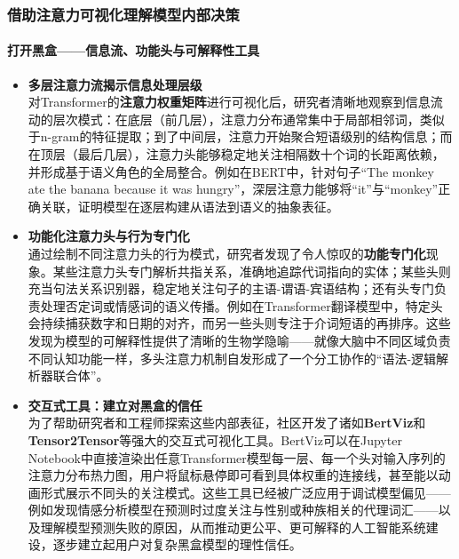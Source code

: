 \documentclass[11pt]{beamer}
\begin{document}
\begin{frame}
\frametitle{借助注意力可视化理解模型内部决策}
\framesubtitle{打开黑盒——信息流、功能头与可解释性工具}

\begin{itemize}
    \item \textbf{多层注意力流揭示信息处理层级} \\
    对Transformer的\textbf{注意力权重矩阵}进行可视化后，研究者清晰地观察到信息流动的层次模式：在底层（前几层），注意力分布通常集中于\alert{局部相邻词}，类似于n-gram的特征提取；到了中间层，注意力开始聚合短语级别的结构信息；而在顶层（最后几层），注意力头能够稳定地关注相隔数十个词的长距离依赖，并形成基于语义角色的全局整合。例如在BERT中，针对句子“The monkey ate the banana because it was hungry”，深层注意力能够将“it”与“monkey”正确关联，证明模型在逐层构建从语法到语义的抽象表征。

    \item \textbf{功能化注意力头与行为专门化} \\
    通过绘制不同注意力头的行为模式，研究者发现了令人惊叹的\textbf{功能专门化}现象。某些注意力头专门解析\alert{共指关系}，准确地追踪代词指向的实体；某些头则充当句法关系识别器，稳定地关注句子的主语-谓语-宾语结构；还有头专门负责处理否定词或情感词的语义传播。例如在Transformer翻译模型中，特定头会持续捕获数字和日期的对齐，而另一些头则专注于介词短语的再排序。这些发现为模型的可解释性提供了清晰的生物学隐喻——就像大脑中不同区域负责不同认知功能一样，多头注意力机制自发形成了一个分工协作的“语法-逻辑解析器联合体”。

    \item \textbf{交互式工具：建立对黑盒的信任} \\
    为了帮助研究者和工程师探索这些内部表征，社区开发了诸如\textbf{BertViz}和\textbf{Tensor2Tensor}等强大的交互式可视化工具。BertViz可以在Jupyter Notebook中直接渲染出任意Transformer模型每一层、每一个头对输入序列的注意力分布热力图，用户将鼠标悬停即可看到具体权重的连接线，甚至能以动画形式展示不同头的关注模式。这些工具已经被广泛应用于\alert{调试模型偏见}——例如发现情感分析模型在预测时过度关注与性别或种族相关的代理词汇——以及理解模型预测失败的原因，从而推动更公平、更可解释的人工智能系统建设，逐步建立起用户对复杂黑盒模型的理性信任。
\end{itemize}
\end{frame}
\end{document}
